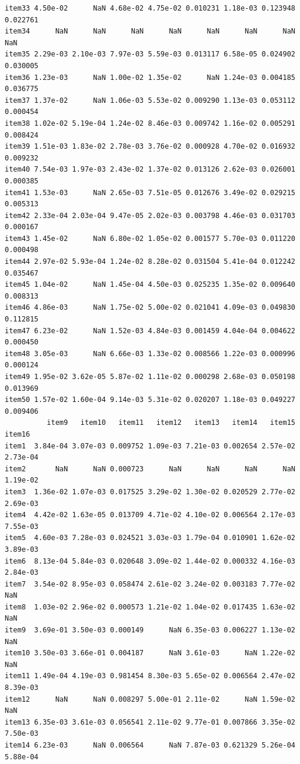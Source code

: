 \documentclass[
  a4paper,
]{ltjsbook}
\begin{document}
\begin{verbatim}
item33 4.50e-02      NaN 4.68e-02 4.75e-02 0.010231 1.18e-03 0.123948 0.022761
item34      NaN      NaN      NaN      NaN      NaN      NaN      NaN      NaN
item35 2.29e-03 2.10e-03 7.97e-03 5.59e-03 0.013117 6.58e-05 0.024902 0.030005
item36 1.23e-03      NaN 1.00e-02 1.35e-02      NaN 1.24e-03 0.004185 0.036775
item37 1.37e-02      NaN 1.06e-03 5.53e-02 0.009290 1.13e-03 0.053112 0.000454
item38 1.02e-02 5.19e-04 1.24e-02 8.46e-03 0.009742 1.16e-02 0.005291 0.008424
item39 1.51e-03 1.83e-02 2.78e-03 3.76e-02 0.000928 4.70e-02 0.016932 0.009232
item40 7.54e-03 1.97e-03 2.43e-02 1.37e-02 0.013126 2.62e-03 0.026001 0.000385
item41 1.53e-03      NaN 2.65e-03 7.51e-05 0.012676 3.49e-02 0.029215 0.005313
item42 2.33e-04 2.03e-04 9.47e-05 2.02e-03 0.003798 4.46e-03 0.031703 0.000167
item43 1.45e-02      NaN 6.80e-02 1.05e-02 0.001577 5.70e-03 0.011220 0.000498
item44 2.97e-02 5.93e-04 1.24e-02 8.28e-02 0.031504 5.41e-04 0.012242 0.035467
item45 1.04e-02      NaN 1.45e-04 4.50e-03 0.025235 1.35e-02 0.009640 0.008313
item46 4.86e-03      NaN 1.75e-02 5.00e-02 0.021041 4.09e-03 0.049830 0.112815
item47 6.23e-02      NaN 1.52e-03 4.84e-03 0.001459 4.04e-04 0.004622 0.000450
item48 3.05e-03      NaN 6.66e-03 1.33e-02 0.008566 1.22e-03 0.000996 0.000124
item49 1.95e-02 3.62e-05 5.87e-02 1.11e-02 0.000298 2.68e-03 0.050198 0.013969
item50 1.57e-02 1.60e-04 9.14e-03 5.31e-02 0.020207 1.18e-03 0.049227 0.009406
          item9   item10   item11   item12   item13   item14   item15   item16
item1  3.84e-04 3.07e-03 0.009752 1.09e-03 7.21e-03 0.002654 2.57e-02 2.73e-04
item2       NaN      NaN 0.000723      NaN      NaN      NaN      NaN 1.19e-02
item3  1.36e-02 1.07e-03 0.017525 3.29e-02 1.30e-02 0.020529 2.77e-02 2.69e-03
item4  4.42e-02 1.63e-05 0.013709 4.71e-02 4.10e-02 0.006564 2.17e-03 7.55e-03
item5  4.60e-03 7.28e-03 0.024521 3.03e-03 1.79e-04 0.010901 1.62e-02 3.89e-03
item6  8.13e-04 5.84e-03 0.020648 3.09e-02 1.44e-02 0.000332 4.16e-03 2.84e-03
item7  3.54e-02 8.95e-03 0.058474 2.61e-02 3.24e-02 0.003183 7.77e-02      NaN
item8  1.03e-02 2.96e-02 0.000573 1.21e-02 1.04e-02 0.017435 1.63e-02      NaN
item9  3.69e-01 3.50e-03 0.000149      NaN 6.35e-03 0.006227 1.13e-02      NaN
item10 3.50e-03 3.66e-01 0.004187      NaN 3.61e-03      NaN 1.22e-02      NaN
item11 1.49e-04 4.19e-03 0.981454 8.30e-03 5.65e-02 0.006564 2.47e-02 8.39e-03
item12      NaN      NaN 0.008297 5.00e-01 2.11e-02      NaN 1.59e-02      NaN
item13 6.35e-03 3.61e-03 0.056541 2.11e-02 9.77e-01 0.007866 3.35e-02 7.50e-03
item14 6.23e-03      NaN 0.006564      NaN 7.87e-03 0.621329 5.26e-04 5.88e-04

\end{verbatim}
\end{document}
